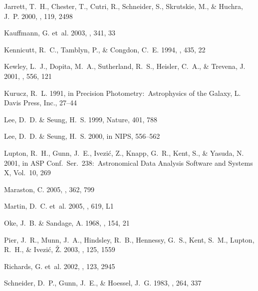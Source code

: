 \documentclass[12pt,preprint]{aastex}
\begin{document}
\begin{thebibliography}{44}
{Jarrett}, T.~H., {Chester}, T., {Cutri}, R., {Schneider}, S., {Skrutskie}, M.,
  \& {Huchra}, J.~P. 2000, \aj, 119, 2498

{Kauffmann}, G. {et~al.} 2003, \mnras, 341, 33

{Kennicutt}, R.~C., {Tamblyn}, P., \& {Congdon}, C.~E. 1994, \apj, 435, 22

{Kewley}, L.~J., {Dopita}, M.~A., {Sutherland}, R.~S., {Heisler}, C.~A., \&
  {Trevena}, J. 2001, \apj, 556, 121

Kurucz, R.~L. 1991, in Precision Photometry:\ Astrophysics of the Galaxy, L.
  Davis Press, Inc., 27--44

Lee, D.~D. \& Seung, H.~S. 1999, Nature, 401, 788

Lee, D.~D. \& Seung, H.~S. 2000, in {NIPS}, 556--562

Lupton, R.~H., Gunn, J.~E., {Ivezi{\'c}}, Z., Knapp, G.~R., Kent, S., \&
  Yasuda, N. 2001, in ASP Conf.\ Ser.\ 238:\ Astronomical Data Analysis
  Software and Systems X, Vol.~10, 269

{Maraston}, C. 2005, \mnras, 362, 799

Martin, D.~C. {et~al.} 2005, \apjl, 619, L1

{Oke}, J.~B. \& {Sandage}, A. 1968, \apj, 154, 21

Pier, J.~R., Munn, J.~A., Hindsley, R.~B., Hennessy, G.~S., Kent, S.~M.,
  Lupton, R.~H., \& {Ivezi{\' c}}, {\v Z}. 2003, \aj, 125, 1559

Richards, G. {et~al.} 2002, \aj, 123, 2945

{Schneider}, D.~P., {Gunn}, J.~E., \& {Hoessel}, J.~G. 1983, \apj, 264, 337


\end{thebibliography}
\end{document}
